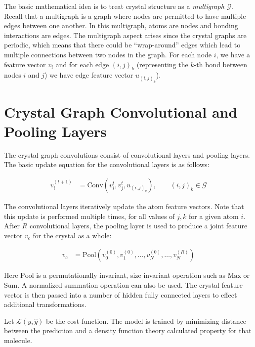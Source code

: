\documentclass[book.tex]{subfiles}
\begin{document}
The basic mathematical idea is to treat crystal structure as a \textit{multigraph} $\mathcal{G}$. Recall that a multigraph is a graph where nodes are permitted to have multiple edges between one another. In this multigraph, atoms are nodes and bonding interactions are edges. The multigraph aspect arises since the crystal graphs are periodic, which means that there could be “wrap-around” edges which lead to multiple connections between two nodes in the graph. For each node $i$, we have a feature vector $v_i$ and for each edge $(i,j)_k$ (representing the $k$-th bond between nodes $i$ and $j$) we have edge feature vector $u_{(i,j)_k}$). 

\section{Crystal Graph Convolutional and Pooling Layers}

The crystal graph convolutions consist of convolutional layers and pooling layers. The basic update equation for the convolutional layers is as follows:

\begin{align}
v_i^{(t+1)} &= \textrm{Conv}\left ( v_i^t, v_j^t, u_{(i,j)_k} \right ), \qquad (i,j)_k \in \mathcal{G} 
\end{align}

The convolutional layers iteratively update the atom feature vectors. Note that this update is performed multiple times, for all values of $j, k$ for a given atom $i$. After $R$ convolutional layers, the pooling layer is used to produce a joint feature vector $v_c$ for the crystal as a whole:

\begin{align}
v_c &= \textrm{Pool} \left (v_0^{(0)},v_1^{(0)},\dotsc,v_N^{(0)}, \dotsc, v_N^{(R)}\right ) 
\end{align}

Here $\textrm{Pool}$ is a permutationally invariant, size invariant operation such as $\textrm{Max}$ or $\textrm{Sum}$. A normalized summation operation can also be used. The crystal feature vector is then passed into a number of hidden fully connected layers to effect additional transformations.

Let $\mathcal{L}(y, \hat{y})$ be the cost-function. The model is trained by minimizing distance between the prediction and a density function theory calculated property for that molecule. 
\end{document}
